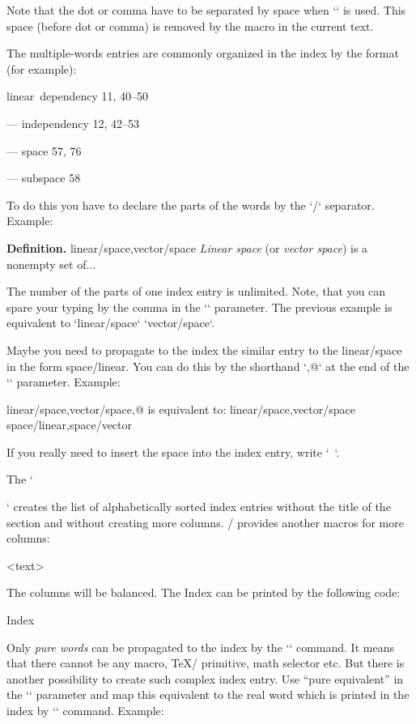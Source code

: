 Note that the dot or comma have to be separated by space when `\iid` is
used. This space (before dot or comma) is removed by the macro in 
the current text.

The multiple-words entries are commonly organized in the index by the format
(for example): 

\medskip

linear~dependency  11, 40--50

--- independency 12, 42--53

--- space 57, 76

--- subspace 58

\medskip

To do this you have to declare the parts of the words by the `/` separator.
Example:

\begtt
{\bf Definition.}
\ii linear/space,vector/space
{\em Linear space} (or {\em vector space}) is a nonempty set of...
\endtt

The number of the parts of one index entry is unlimited. Note, that you can
spare your typing by the comma in the `\ii` parameter. The previous example
is equivalent to `\ii linear/space` `\ii vector/space`.

Maybe you need to propagate to the index the similar entry to the
linear/space in the form space/linear. You can do this by the shorthand `,@`
at the end of the `\ii` parameter. Example:

\begtt
\ii linear/space,vector/space,@
is equivalent to:
\ii linear/space,vector/space \ii space/linear,space/vector
\endtt

If you really need to insert the space into the index entry, write `~`.

The `\makeindex` creates the list of alphabetically sorted index entries
without the title of the section and without creating more columns. \OpTeX/
provides another macros for more columns: 

\begtt
{}
<text>
\endmulti
\endtt

The columns will be balanced. The Index can be printed by the following
code:

\begtt
\sec Index\par
{} \makeindex \endmulti
\endtt

Only {\em pure words} can be propagated to the index by the `\ii` command. It
means that there cannot be any macro, \TeX/ primitive, math selector etc.
But there is another possibility to create such complex index entry. Use
``pure equivalent'' in the `\ii` parameter and map this equivalent to the
real word which is printed in the index by `\iis` command. Example:

